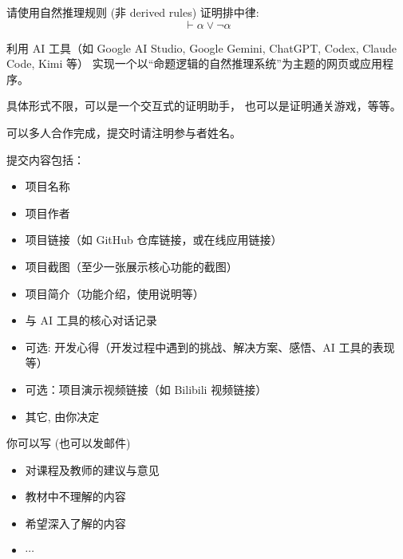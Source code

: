 \documentclass[a4paper, justified]{tufte-handout}
\begin{document}
\begin{solution}

\end{solution}

\beginoptional

\begin{problem}[命题逻辑的自然推理系统]
  请使用自然推理规则 (非 derived rules) 证明排中律:
  \[
    \vdash \alpha \lor \lnot\alpha
  \]
\end{problem}

\begin{solution}
\end{solution}

\begin{problem}
  利用 AI 工具（如 Google AI Studio, Google Gemini,
  ChatGPT, Codex, Claude Code, Kimi 等）
  实现一个以``命题逻辑的自然推理系统''为主题的网页或应用程序。

  具体形式不限，可以是一个交互式的证明助手，
  也可以是证明通关游戏，等等。

  可以多人合作完成，提交时请注明参与者姓名。

  提交内容包括：
  \begin{itemize}
    \item 项目名称
    \item 项目作者
    \item 项目链接（如 GitHub 仓库链接，或在线应用链接）
    \item 项目截图（至少一张展示核心功能的截图）
    \item 项目简介（功能介绍，使用说明等）
    \item 与 AI 工具的核心对话记录
    \item 可选: 开发心得（开发过程中遇到的挑战、解决方案、感悟、AI 工具的表现等）
    \item 可选：项目演示视频链接（如 Bilibili 视频链接）
    \item 其它, 由你决定
  \end{itemize}
\end{problem}

\begin{solution}
\end{solution}


\begincorrection

\beginfb

你可以写 (也可以发邮件)
\begin{itemize}
  \item 对课程及教师的建议与意见
  \item 教材中不理解的内容
  \item 希望深入了解的内容
  \item $\cdots$
\end{itemize}
\end{document}
